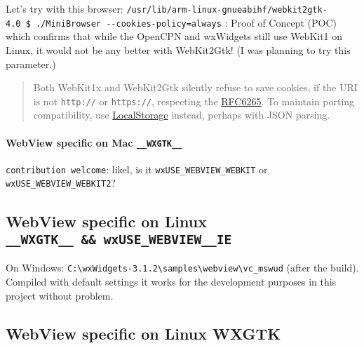 \documentclass[11pt]{article}
\begin{document}
    Let's try with this browser:
\texttt{/usr/lib/arm-linux-gnueabihf/webkit2gtk-4.0\ \$\ ./MiniBrowser\ -\/-cookies-policy=always}
: Proof of Concept (POC) which confirms that while the OpenCPN and
wxWidgets still use WebKit1 on Linux, it would not be any better with
WebKit2Gtk! (I was planning to try this parameter.)

    \begin{quote}
Both WebKit1x and WebKit2Gtk silently refuse to save cookies, if the URI
is not \texttt{http://} or \texttt{https://}, respecting the
\href{https://tools.ietf.org/html/rfc6265}{RFC6265}. To maintain porting
compatibility, use
\href{https://developer.mozilla.org/en-US/docs/Web/API/Window/localStorage}{LocalStorage}
instead, perhaps with JSON parsing.
\end{quote}

    \hypertarget{webview-specific-on-mac-__wxgtk__}{%
\paragraph{\texorpdfstring{WebView specific on Mac
\texttt{\_\_WXGTK\_\_}}{WebView specific on Mac \_\_WXGTK\_\_}}\label{webview-specific-on-mac-__wxgtk__}}

    \texttt{contribution\ welcome}: likel, is it
\texttt{wxUSE\_WEBVIEW\_WEBKIT} or \texttt{wxUSE\_WEBVIEW\_WEBKIT2}?

    \hypertarget{webview-specific-on-linux-__wxgtk__-wxuse_webview__ie}{%
\subsection{\texorpdfstring{WebView specific on Linux
\texttt{\_\_WXGTK\_\_\ \&\&\ wxUSE\_WEBVIEW\_\_IE}}{WebView specific on Linux \_\_WXGTK\_\_ \&\& wxUSE\_WEBVIEW\_\_IE}}\label{webview-specific-on-linux-__wxgtk__-wxuse_webview__ie}}

    On Windows:
\texttt{C:\textbackslash{}wxWidgets-3.1.2\textbackslash{}samples\textbackslash{}webview\textbackslash{}vc\_mswud}
(after the build). Compiled with default settings it works for the
development purposes in this project without problem.

    \hypertarget{webview-specific-on-linux-wxgtk}{%
\subsection{\texorpdfstring{WebView specific on Linux
\textbf{WXGTK}}{WebView specific on Linux WXGTK}}\label{webview-specific-on-linux-wxgtk}}
\end{document}
